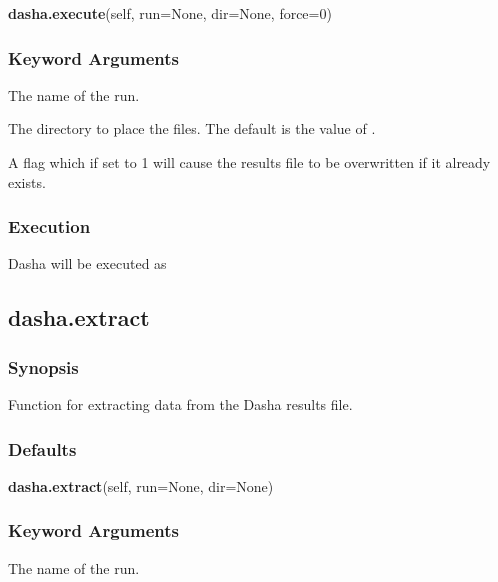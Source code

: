 \textsf{\textbf{dasha.execute}(self, run=None, dir=None, force=0)}


\subsubsection{Keyword Arguments}

  The name of the run. 

  The directory to place the files.  The default is the value of . 

  A flag which if set to 1 will cause the results file to be overwritten if it already exists. 




\subsubsection{Execution}

Dasha will be executed as





\newpage

\subsection{dasha.extract}


\subsubsection{Synopsis}

Function for extracting data from the Dasha results file.



\subsubsection{Defaults}

\textsf{\textbf{dasha.extract}(self, run=None, dir=None)}


\subsubsection{Keyword Arguments}

  The name of the run. 

